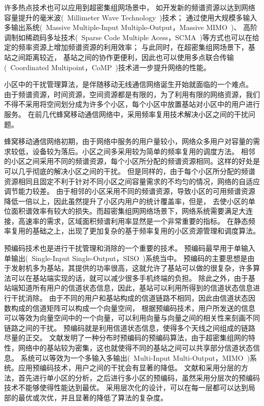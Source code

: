 许多热点技术也可以应用到超密集组网场景中，
如开发新的频谱资源以达到网络容量提升的毫米波(~Millimeter Wave Technology~)技术；
通过使用大规模多输入多输出系统(~Massive Multiple-Input Multiple-Output，Massive MIMO~)、
高阶调制如稀疏码多址技术(~Sparse Code Multiple Acess，SCMA~)等方式也可以在给定的频率资源上增加频谱资源的利用效率；
与此同时，在超密集组网场景下，基站之间距离较近，
基站之间的协作更便利，因此也可以使用多点联合传输(~Coordinated Multipoint，CoMP~)技术进一步提升网络的性能。

小区中的干扰管理算法，是伴随移动无线通信网络诞生开始就面临的一个难点。
由于频谱资源，时间资源，空间资源都是有限的，为了利用有限的网络资源，我们不得不采用将空间划分成为许多个小区，每个小区中放置基站对小区中的用户进行服务。
在前几代蜂窝移动通信网络中，采用频率复用技术解决小区之间的干扰问题。

蜂窝移动通信网络初期，由于网络中服务的用户量较小，网络众多用户对容量的需求较低，设备较为落后。小区之间多采用较为简单的频率复用的调度方法。
相邻的小区之间采用不同的频谱资源，每个小区所分配的频谱资源相同。这样的好处是可以几乎彻底的解决小区之间的干扰。
但是同样的，由于每个小区所分配的频谱资源相同且固定不利于针对不同小区之间容量需求的不均匀的情况，网络的自适应调节能力较差。
由于相邻的小区采用不同的频谱资源，导致小区的可用频谱资源降低一倍以上，因此虽然提升了小区内用户的统计覆盖率，但是，
去使小区的单位面积谱效率有较大的损失。而超密集组网网络场景下，网络系统需要满足大连接，高速率的需求，区域面积频谱利用率显然是一个非常重要的指标。
在静态频率复用的基础之上，出现了更加复杂的基于频率复用的小区资源管理和调度算法。

预编码技术也是进行干扰管理和消除的一个重要的技术。
预编码最早用于单输入单输出(~Single-Input Single-Output，SISO~)系统当中。
预编码的主要思想是由于发射机多为基站，其提供的功率很高，这就允许了基站可以做的很复杂，许多算法可以在基站端实现的话，就可以减少很多手机终端的负担。
除此之外，由于基站端知道所有用户的信道状态信息，因此，基站可以利用所得到的信道状态信息进行干扰消除。
由于不同的用户和基站构成的信道链路不相同，因此由信道状态因数构成的信道矩阵可以构成一个向量空间，
根据预编码技术，用户所发送的信息可以等效为向量空间中的一个向量，可以利用向量与向量之间的相关性来刻画不同链路之间的干扰。
预编码就是利用信道状态信息，使得多个天线之间组成的链路尽量的正交。
文献\cite{DisPrecode}发明了一种分布时预编码的预编码算法，由于超密集组网的特性，网络中的基站较为密集，这也就使得不同的基站之间可以共享部分信道状态信息。
系统可以等效为一个多输入多输出(~Multi-Input Multi-Output，MIMO~)系统。应用预编码技术，用户之间的干扰会有显著的降低。
文献\cite{LayerPrecode}和\cite{Layer2Precode}采用分层的方法，首先进行单小区的分析，之后进行多小区的预编码，虽然采用分层次的预编码技术不能够使得性能达到最优。
采用层次化的设计，可以在每一层都可以达到局部的最优或次优，并且显著的降低了算法的复杂度。

